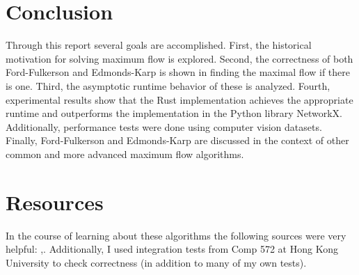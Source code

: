 \documentclass{article}
\begin{document}
\section{Conclusion}
Through this report several goals are accomplished. First, the historical motivation for solving maximum flow is explored. Second, the correctness of both Ford-Fulkerson and Edmonds-Karp is shown in finding the maximal flow if there is one. Third, the asymptotic runtime behavior of these is analyzed. Fourth, experimental results show that the Rust implementation achieves the appropriate runtime and outperforms the implementation in the Python library NetworkX. Additionally, performance tests were done using computer vision datasets. Finally, Ford-Fulkerson and Edmonds-Karp are discussed in the context of other common and more advanced maximum flow algorithms.

\section{Resources}
In the course of learning about these algorithms the following sources were very helpful: \cite{cornell-ek},\cite{umass-ek}. Additionally, I used integration tests from Comp 572 at Hong Kong University to check correctness (in addition to many of my own tests)\cite{UstProject}.




\end{document}
